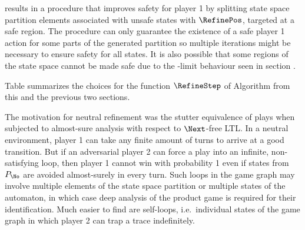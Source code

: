     results in a procedure that improves safety for player 1 by splitting state space partition elements associated with unsafe states with $\RefinePos$, targeted at a safe region.
    The procedure can only guarantee the existence of a safe player 1 action for some parts of the generated partition so multiple iterations might be necessary to ensure safety for all states.
    It is also possible that some regions of the state space cannot be made safe due to the \epsilon-limit behaviour seen in section .

    Table  summarizes the choices for the function $\RefineStep$ of Algorithm  from this and the previous two sections.

\stopsubsection


    \startalgorithmic[numbering=no,margin=0em]
    \stopalgorithmic
    \startalgorithmic
                \ENDIF
            \ENDIF
        \ENDFOR
    \stopalgorithmic
\stopbuffer

\startsubsection[title={Loop Removal},reference={sec:refinement-holistic-loops}]

    The motivation for neutral refinement was the stutter equivalence of plays when subjected to almost-sure analysis with respect to $\Next$-free LTL.
    In a neutral environment, player 1 can take any finite amount of turns to arrive at a good transition.
    But if an adversarial player 2 can force a play into an infinite, non-satisfying loop, then player 1 cannot win with probability 1 even if states from $P_\No$ are avoided almost-surely in every turn.
    Such loops in the game graph may involve multiple elements of the state space partition or multiple states of the automaton, in which case deep analysis of the product game is required for their identification.
    Much easier to find are self-loops, i.e.\ individual states of the game graph in which player 2 can trap a trace indefinitely.

